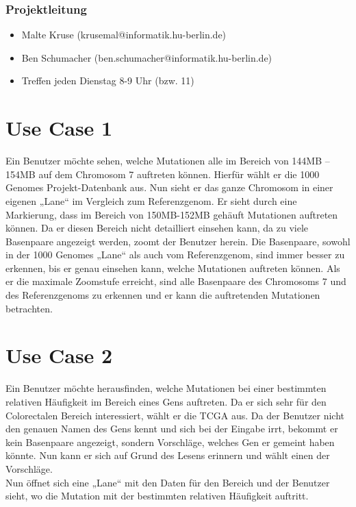 \documentclass{beamer}
\begin{document}
\begin{frame}
	\frametitle{Projektleitung}
	\begin{itemize}
		\item Malte Kruse (krusemal@informatik.hu-berlin.de)
		\item Ben Schumacher (ben.schumacher@informatik.hu-berlin.de)
		\item Treffen jeden Dienstag 8-9 Uhr (bzw. 11)
	\end{itemize}
\end{frame}

\section{Use Case 1}
\begin{frame}
Ein Benutzer möchte sehen, welche Mutationen alle im Bereich von 144MB – 154MB auf dem Chromosom 7 auftreten können. Hierfür wählt er die 1000 Genomes Projekt-Datenbank aus.
Nun sieht er das ganze Chromosom in einer eigenen „Lane“ im Vergleich zum Referenzgenom. Er sieht durch eine Markierung, dass im Bereich von 150MB-152MB gehäuft Mutationen auftreten können. Da er diesen Bereich nicht detailliert einsehen kann, da zu viele Basenpaare angezeigt werden, zoomt der Benutzer herein. Die Basenpaare, sowohl in der 1000 Genomes „Lane“ als auch vom Referenzgenom, sind immer besser zu erkennen, bis er genau einsehen kann, welche Mutationen auftreten können. Als er die maximale Zoomstufe erreicht, sind alle Basenpaare des Chromosoms 7 und des Referenzgenoms zu erkennen und er kann die auftretenden Mutationen betrachten.
\end{frame}

\section{Use Case 2}
\begin{frame}
Ein Benutzer möchte herausfinden, welche Mutationen bei einer bestimmten relativen Häufigkeit im Bereich eines Gens auftreten. Da er sich sehr für den Colorectalen Bereich interessiert, wählt er die TCGA aus. Da der Benutzer nicht den genauen Namen des Gens kennt und sich bei der Eingabe irrt, bekommt er kein Basenpaare angezeigt, sondern Vorschläge, welches Gen er gemeint haben könnte. Nun kann er sich auf Grund des Lesens erinnern und wählt einen der Vorschläge.\\
Nun öffnet sich eine „Lane“ mit den Daten für den Bereich und der Benutzer sieht, wo die Mutation mit der bestimmten relativen Häufigkeit auftritt.
\end{frame}
\end{document}
